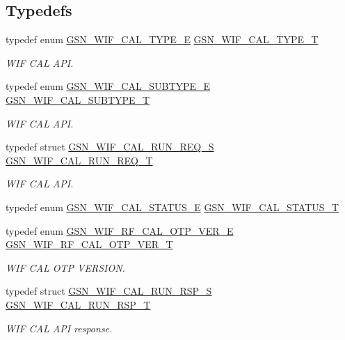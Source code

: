 \subsection*{Typedefs}
\begin{DoxyCompactItemize}
\item 
typedef enum \hyperlink{a00607_a8806538ca7eb7172842f91d2d44d38f7}{GSN\_\-WIF\_\-CAL\_\-TYPE\_\-E} \hyperlink{a00607_a9dc79fa491ceafce8c7f71c92861bb43}{GSN\_\-WIF\_\-CAL\_\-TYPE\_\-T}
\begin{DoxyCompactList}\small\item\em WIF CAL API. \end{DoxyCompactList}\item 
typedef enum \hyperlink{a00607_af3a815815ae9fc3d8f892d4d89ac90aa}{GSN\_\-WIF\_\-CAL\_\-SUBTYPE\_\-E} \hyperlink{a00607_a6fed31ed15a2c8f32a4bda91ae7c7870}{GSN\_\-WIF\_\-CAL\_\-SUBTYPE\_\-T}
\begin{DoxyCompactList}\small\item\em WIF CAL API. \end{DoxyCompactList}\item 
typedef struct \hyperlink{a00319}{GSN\_\-WIF\_\-CAL\_\-RUN\_\-REQ\_\-S} \hyperlink{a00607_a8a9394dbece8b33318df662ac02fcbc5}{GSN\_\-WIF\_\-CAL\_\-RUN\_\-REQ\_\-T}
\begin{DoxyCompactList}\small\item\em WIF CAL API. \end{DoxyCompactList}\item 
typedef enum \hyperlink{a00607_a838df779eaf2331fe78602a674a579bf}{GSN\_\-WIF\_\-CAL\_\-STATUS\_\-E} \hyperlink{a00607_aa763754f7a0152deadf587aad20f022c}{GSN\_\-WIF\_\-CAL\_\-STATUS\_\-T}
\item 
typedef enum \hyperlink{a00607_a26bfefcbc5fe1a4e7be7bf911f5a6487}{GSN\_\-WIF\_\-RF\_\-CAL\_\-OTP\_\-VER\_\-E} \hyperlink{a00607_a8cef2377b99755a5588d68051d9be59c}{GSN\_\-WIF\_\-RF\_\-CAL\_\-OTP\_\-VER\_\-T}
\begin{DoxyCompactList}\small\item\em WIF CAL OTP VERSION. \end{DoxyCompactList}\item 
typedef struct \hyperlink{a00320}{GSN\_\-WIF\_\-CAL\_\-RUN\_\-RSP\_\-S} \hyperlink{a00607_aa8ebea34fbddec643c0faa7d5f58319e}{GSN\_\-WIF\_\-CAL\_\-RUN\_\-RSP\_\-T}
\begin{DoxyCompactList}\small\item\em WIF CAL API response. \end{DoxyCompactList}\end{DoxyCompactItemize}
